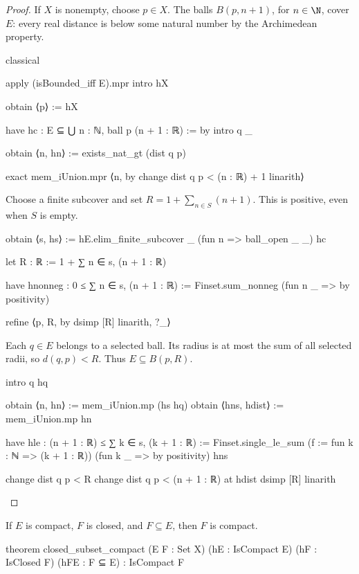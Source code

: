 \begin{proof}
  If $X$ is nonempty, choose $p\in X$.
  The balls $B(p,n+1)$, for $n\in\N$, cover $E$: every real distance is below some natural number
  by the Archimedean property.

  \begin{lean}
    classical

    apply (isBounded_iff E).mpr
    intro hX

    obtain ⟨p⟩ := hX

    have hc : E ⊆ ⋃ n : ℕ, ball p (n + 1 : ℝ) := by
      intro q _

      obtain ⟨n, hn⟩ := exists_nat_gt (dist q p)

      exact mem_iUnion.mpr ⟨n, by
        change dist q p < (n : ℝ) + 1
        linarith⟩
  \end{lean}

  Choose a finite subcover and set $R=1+\sum_{n\in S}(n+1)$.
  This is positive, even when $S$ is empty.

  \begin{lean}
    obtain ⟨s, hs⟩ := hE.elim_finite_subcover _ (fun n => ball_open _ _) hc

    let R : ℝ := 1 + ∑ n ∈ s, (n + 1 : ℝ)

    have hnonneg : 0 ≤ ∑ n ∈ s, (n + 1 : ℝ) :=
      Finset.sum_nonneg (fun n _ => by positivity)

    refine ⟨p, R, by
      dsimp [R]
      linarith, ?_⟩
  \end{lean}

  Each $q\in E$ belongs to a selected ball.
  Its radius is at most the sum of all selected radii, so $d(q,p)<R$.
  Thus $E\subseteq B(p,R)$.

  \begin{lean}
    intro q hq

    obtain ⟨n, hn⟩ := mem_iUnion.mp (hs hq)
    obtain ⟨hns, hdist⟩ := mem_iUnion.mp hn

    have hle : (n + 1 : ℝ) ≤ ∑ k ∈ s, (k + 1 : ℝ) :=
      Finset.single_le_sum (f := fun k : ℕ => (k + 1 : ℝ)) (fun k _ => by positivity) hns

    change dist q p < R
    change dist q p < (n + 1 : ℝ) at hdist
    dsimp [R]
    linarith
  \end{lean}

\end{proof}

\begin{proposition}
  \label{ma:thm:closed-subset-of-compact-set-is-compact}
  If $E$ is compact, $F$ is closed, and $F\subseteq E$, then $F$ is compact.

  \begin{lean}
    theorem closed_subset_compact (E F : Set X) (hE : IsCompact E)
        (hF : IsClosed F) (hFE : F ⊆ E) : IsCompact F
  \end{lean}
\end{proposition}

